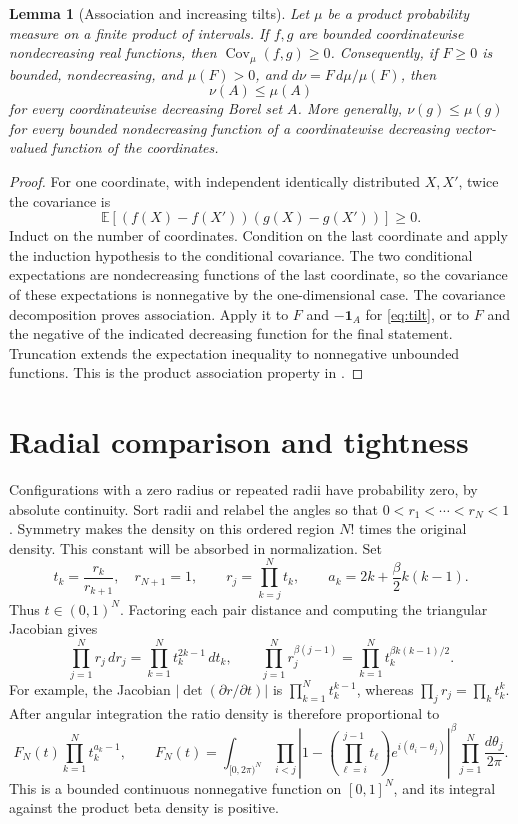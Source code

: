 \documentclass[11pt,a4paper]{article}
\numberwithin{equation}{section}
\newtheorem{lemma}[theorem]{Lemma}
\theoremstyle{definition}
\theoremstyle{remark}
\newcommand{\E}{\mathbb E}
\newcommand{\ind}{\mathbf 1}
\newcommand{\Cov}{\operatorname{Cov}}
\begin{document}
\begin{lemma}[Association and increasing tilts]\label{lem:association}
Let $\mu$ be a product probability measure on a finite product of intervals.
If $f,g$ are bounded coordinatewise nondecreasing real functions, then
$\Cov_\mu(f,g)\ge0$. Consequently, if $F\ge0$ is bounded, nondecreasing,
and $\mu(F)>0$, and $d\nu=F\,d\mu/\mu(F)$, then
\begin{equation}\label{eq:tilt}
 \nu(A)\le\mu(A)
\end{equation}
for every coordinatewise decreasing Borel set $A$. More generally,
$\nu(g)\le\mu(g)$ for every bounded nondecreasing function of a
coordinatewise decreasing vector-valued function of the coordinates.
\end{lemma}
\begin{proof}
For one coordinate, with independent identically distributed $X,X'$, twice
the covariance is
\[
 \E[(f(X)-f(X'))(g(X)-g(X'))]\ge0.
\]
Induct on the number of coordinates. Condition on the last coordinate and
apply the induction hypothesis to the conditional covariance. The two
conditional expectations are nondecreasing functions of the last
coordinate, so the covariance of these expectations is nonnegative by the
one-dimensional case. The covariance decomposition proves association.
Apply it to $F$ and $-\ind_A$ for \eqref{eq:tilt}, or to $F$ and the
negative of the indicated decreasing function for the final statement.
Truncation extends the expectation inequality to nonnegative unbounded
functions. This is the product association property in \cite{EPW}.
\end{proof}

\section{Radial comparison and tightness}\label{sec:core-proof}
Configurations with a zero radius or repeated radii have probability zero,
by absolute continuity. Sort radii and relabel the angles so that
$0<r_1<\cdots<r_N<1$. Symmetry makes the density on this ordered region
$N!$ times the original density. This constant will be absorbed in
normalization. Set
\begin{equation}\label{eq:ratios}
 t_k=\frac{r_k}{r_{k+1}},\quad r_{N+1}=1,
 \qquad r_j=\prod_{k=j}^N t_k,
 \qquad a_k=2k+\frac{\beta}{2}k(k-1).
\end{equation}
Thus $t\in(0,1)^N$. Factoring each pair distance and computing the
triangular Jacobian gives
\[
 \prod_{j=1}^N r_j\,dr_j=\prod_{k=1}^N t_k^{2k-1}\,dt_k,
 \qquad
 \prod_{j=1}^N r_j^{\beta(j-1)}
 =\prod_{k=1}^N t_k^{\beta k(k-1)/2}.
\]
For example, the Jacobian $|\det(\partial r/\partial t)|$ is
$\prod_{k=1}^N t_k^{k-1}$, whereas $\prod_jr_j=\prod_kt_k^k$.
After angular integration the ratio density is therefore proportional to
\begin{equation}\label{eq:ratio-density}
 F_N(t)\prod_{k=1}^N t_k^{a_k-1},
 \qquad
 F_N(t)=\int_{[0,2\pi)^N}
 \prod_{i<j}\left|1-
  \left(\prod_{\ell=i}^{j-1}t_\ell\right)e^{i(\theta_i-\theta_j)}
 \right|^\beta\prod_{j=1}^N\frac{d\theta_j}{2\pi}.
\end{equation}
This is a bounded continuous nonnegative function on $[0,1]^N$, and its
integral against the product beta density is positive.
\end{document}

